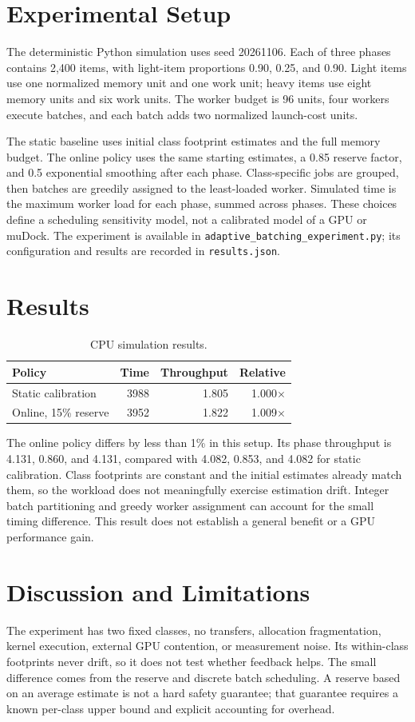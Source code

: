 \documentclass[11pt]{article}
\begin{document}
\section{Experimental Setup}
The deterministic Python simulation uses seed 20261106. Each of three phases contains 2,400 items, with light-item proportions 0.90, 0.25, and 0.90. Light items use one normalized memory unit and one work unit; heavy items use eight memory units and six work units. The worker budget is 96 units, four workers execute batches, and each batch adds two normalized launch-cost units.

The static baseline uses initial class footprint estimates and the full memory budget. The online policy uses the same starting estimates, a 0.85 reserve factor, and 0.5 exponential smoothing after each phase. Class-specific jobs are grouped, then batches are greedily assigned to the least-loaded worker. Simulated time is the maximum worker load for each phase, summed across phases. These choices define a scheduling sensitivity model, not a calibrated model of a GPU or muDock. The experiment is available in \texttt{adaptive\_batching\_experiment.py}; its configuration and results are recorded in \texttt{results.json}.

\section{Results}
\begin{table}[t]
\centering
\scriptsize
\caption{CPU simulation results.}
\label{tab:results}
\begin{tabular}{lrrr}
\toprule
Policy & Time & Throughput & Relative \\
\midrule
Static calibration & 3988 & 1.805 & 1.000$\times$ \\
Online, 15\% reserve & 3952 & 1.822 & 1.009$\times$ \\
\bottomrule
\end{tabular}
\end{table}
The online policy differs by less than 1\% in this setup. Its phase throughput is 4.131, 0.860, and 4.131, compared with 4.082, 0.853, and 4.082 for static calibration. Class footprints are constant and the initial estimates already match them, so the workload does not meaningfully exercise estimation drift. Integer batch partitioning and greedy worker assignment can account for the small timing difference. This result does not establish a general benefit or a GPU performance gain.

\section{Discussion and Limitations}
The experiment has two fixed classes, no transfers, allocation fragmentation, kernel execution, external GPU contention, or measurement noise. Its within-class footprints never drift, so it does not test whether feedback helps. The small difference comes from the reserve and discrete batch scheduling. A reserve based on an average estimate is not a hard safety guarantee; that guarantee requires a known per-class upper bound and explicit accounting for overhead.
\end{document}
